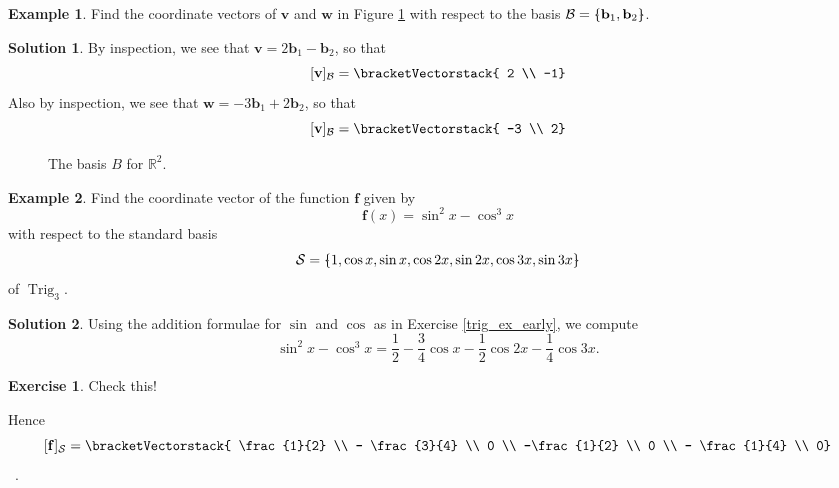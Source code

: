 \documentclass[a4paper,11pt]{book}
\theoremstyle{definition}
\newtheorem{exercise}{Exercise}
\newtheorem{example_environment}{Example}[chapter]
\newtheorem*{solution}{Solution}
\newcommand{\ve}[1]{\mathbf{#1}}
\newcommand{\basis}[1]{{\mathcal #1}}
\newcommand{\cvector}[1]{\bracketVectorstack{#1}}
\newenvironment{example}
	{
		\begin{oframed} 
		\begin{example_environment}
	}
	{
		\end{example_environment}
		\end{oframed}
	}
\newcommand{\bmark}{\raisebox{.53ex}{\rule{.2em}{.1ex}}}
\newcommand{\bopen}{{\protect\ooalign{\{\cr\hfil\bmark\hfil\cr}}}
\newcommand{\bclose}{{\protect\ooalign{\}\cr\hfil\bmark\hfil\cr}}}
\DeclareMathOperator{\Trig}{Trig}
\begin{document}
\begin{example} \label{coord_vectors_finding_example}Find the coordinate vectors of $\ve{v}$ and $\ve{w}$ in Figure \ref{v_and_w_in_basis_B} with respect to the basis $\basis{B} = \bopen \ve{b}_1, \ve{b}_2 \bclose$.

\begin{solution} By inspection, we see that $\ve{v} = 2 \ve{b}_1 - \ve{b}_2$, so that
\[
 [\ve{v}]_\basis{B} = \cvector{ 2 \\ -1}
\]
Also by inspection, we see that $\ve{w} = -3 \ve{b}_1 + 2 \ve{b}_2$, so that
\[
 [\ve{v}]_\basis{B} = \cvector{ -3 \\ 2}
\]
\end{solution}

\end{example}
\begin{figure}
	
\caption{\label{v_and_w_in_basis_B}
The basis $B$ for $\mathbb{R}^2$.}
\end{figure}


\begin{example} Find the coordinate vector of the function $\ve{f}$ given by 
\[
 \ve{f}(x) = \sin^2 x - \cos^3 x
\]
with respect to the standard basis
\[
\basis{S} = \bopen 1, \cos x, \sin x, \cos 2x, \sin 2x, \cos 3x, \sin 3x\bclose
\]
of $\Trig_3$.
\begin{solution} Using the addition formulae for $\sin$ and $\cos$ as in Exercise \ref{trig_ex_early}, we compute
\[ 
 \sin^2 x - \cos^3 x = \frac{1}{2} - \frac{3}{4} \cos x - \frac{1}{2} \cos 2x - \frac{1}{4} \cos 3x.
\]
\begin{exercise} Check this!
\end{exercise}
Hence
\[
 [\ve{f}]_\basis{S} = \cvector{ \frac{1}{2} \\ - \frac{3}{4} \\ 0 \\ -\frac{1}{2} \\ 0 \\ - \frac{1}{4} \\ 0}
\] \, .
\end{solution}

\end{example}
\end{document}
